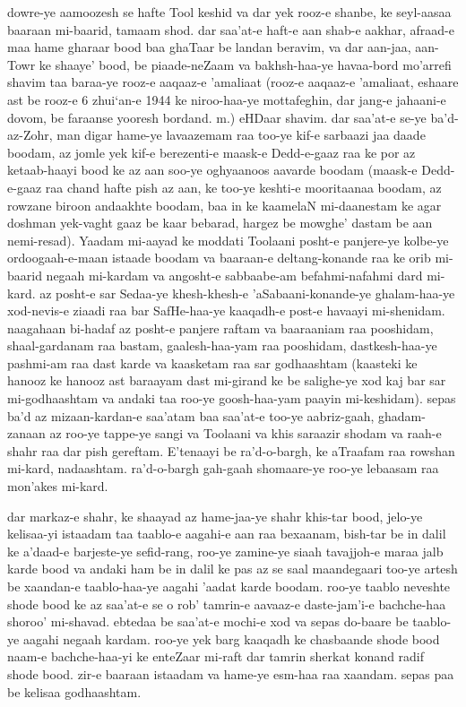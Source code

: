 \documentclass{article}
\begin{document}
dowre-ye aamoozesh se hafte Tool keshid va dar yek rooz-e shanbe, ke
seyl-aasaa baaraan mi-baarid, tamaam shod.  dar saa'at-e haft-e aan shab-e
aakhar, afraad-e maa hame gharaar bood baa ghaTaar be landan beravim, va dar
aan-jaa, aan-Towr ke shaaye' bood, be piaade-neZaam va bakhsh-haa-ye
havaa-bord mo'arrefi shavim taa baraa-ye rooz-e aaqaaz-e 'amaliaat (rooz-e
aaqaaz-e 'amaliaat, eshaare ast be rooz-e 6 zhui`an-e 1944 ke niroo-haa-ye
mottafeghin, dar jang-e jahaani-e dovom, be faraanse yooresh bordand. m.)
eHDaar shavim.  dar saa'at-e se-ye ba'd-az-Zohr, man digar hame-ye
lavaazemam raa too-ye kif-e sarbaazi jaa daade boodam, az jomle yek kif-e
berezenti-e maask-e Dedd-e-gaaz raa ke por az ketaab-haayi bood ke az aan
soo-ye oghyaanoos aavarde boodam (maask-e Dedd-e-gaaz raa chand hafte pish az
aan, ke too-ye keshti-e mooritaanaa boodam, az rowzane biroon andaakhte
boodam, baa in ke kaamelaN mi-daanestam ke agar doshman yek-vaght gaaz be
kaar bebarad, hargez be mowghe' dastam be aan nemi-resad).  Yaadam mi-aayad
ke moddati Toolaani posht-e panjere-ye kolbe-ye ordoogaah-e-maan istaade
boodam va baaraan-e deltang-konande raa ke orib mi-baarid negaah mi-kardam
va angosht-e sabbaabe-am befahmi-nafahmi dard mi-kard.  az posht-e sar
Sedaa-ye khesh-khesh-e 'aSabaani-konande-ye ghalam-haa-ye xod-nevis-e ziaadi
raa bar SafHe-haa-ye kaaqadh-e post-e havaayi mi-shenidam.  naagahaan bi-hadaf
az posht-e panjere raftam va baaraaniam raa pooshidam, shaal-gardanam raa
bastam, gaalesh-haa-yam raa pooshidam, dastkesh-haa-ye pashmi-am raa dast
karde va kaasketam raa sar godhaashtam (kaasteki ke hanooz ke hanooz ast
baraayam dast mi-girand ke be salighe-ye xod kaj bar sar mi-godhaashtam va
andaki taa roo-ye goosh-haa-yam paayin mi-keshidam).  sepas ba'd az
mizaan-kardan-e saa'atam baa saa'at-e too-ye aabriz-gaah, ghadam-zanaan az
roo-ye tappe-ye sangi va Toolaani va khis saraazir shodam va raah-e shahr raa
dar pish gereftam.  E'tenaayi be ra'd-o-bargh, ke aTraafam raa rowshan
mi-kard, nadaashtam.  ra'd-o-bargh gah-gaah shomaare-ye roo-ye lebaasam raa
mon'akes mi-kard.

dar markaz-e shahr, ke shaayad az hame-jaa-ye shahr khis-tar bood, jelo-ye
kelisaa-yi istaadam taa taablo-e aagahi-e aan raa bexaanam, bish-tar be in
dalil ke a'daad-e barjeste-ye sefid-rang, roo-ye zamine-ye siaah tavajjoh-e
maraa jalb karde bood va andaki ham be in dalil ke pas az se saal
maandegaari too-ye artesh be xaandan-e taablo-haa-ye aagahi 'aadat karde
boodam.  roo-ye taablo neveshte shode bood ke az saa'at-e se o rob' tamrin-e
aavaaz-e daste-jam'i-e bachche-haa shoroo' mi-shavad.  ebtedaa be saa'at-e
mochi-e xod va sepas do-baare be taablo-ye aagahi negaah kardam.  roo-ye yek
barg kaaqadh ke chasbaande shode bood naam-e bachche-haa-yi ke enteZaar
mi-raft dar tamrin sherkat konand radif shode bood.  zir-e baaraan istaadam
va hame-ye esm-haa raa xaandam.  sepas paa be kelisaa godhaashtam.
\end{document}
